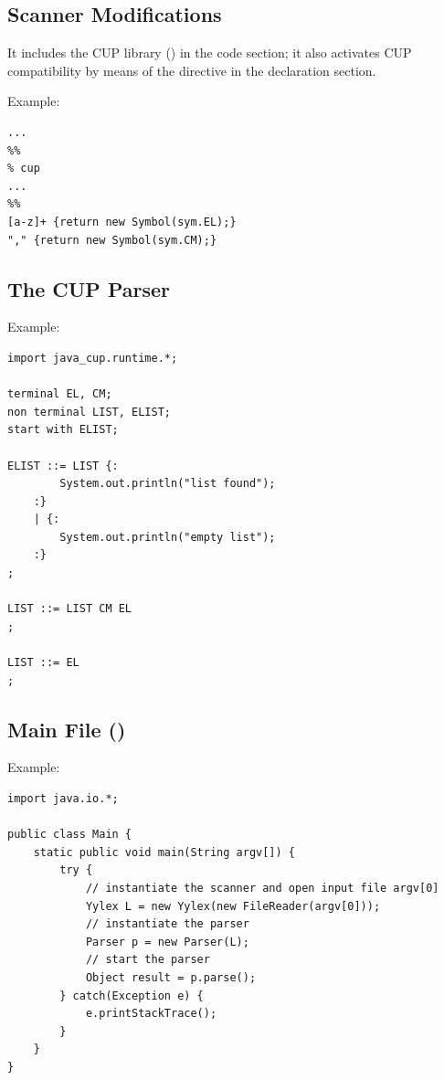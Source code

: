 \subsection{Scanner Modifications}
It includes the CUP library () in the code section; it also activates CUP compatibility by means of the  directive in the declaration section.

Example:
\begin{lstlisting}[frame=single]
...
%%
% cup
...
%%
[a-z]+ {return new Symbol(sym.EL);}
"," {return new Symbol(sym.CM);}
\end{lstlisting}

\subsection{The CUP Parser}
Example:
\begin{lstlisting}[frame=single]
import java_cup.runtime.*;

terminal EL, CM;
non terminal LIST, ELIST;
start with ELIST;

ELIST ::= LIST {:
        System.out.println("list found");
    :}
    | {:
        System.out.println("empty list");
    :}
;

LIST ::= LIST CM EL
;

LIST ::= EL
;
\end{lstlisting}

\subsection{Main File ()}
Example:
\begin{lstlisting}[frame=single]
import java.io.*;

public class Main {
    static public void main(String argv[]) {
        try {
            // instantiate the scanner and open input file argv[0]
            Yylex L = new Yylex(new FileReader(argv[0]));
            // instantiate the parser
            Parser p = new Parser(L);
            // start the parser
            Object result = p.parse();
        } catch(Exception e) {
            e.printStackTrace();
        }
    }
}
\end{lstlisting}

